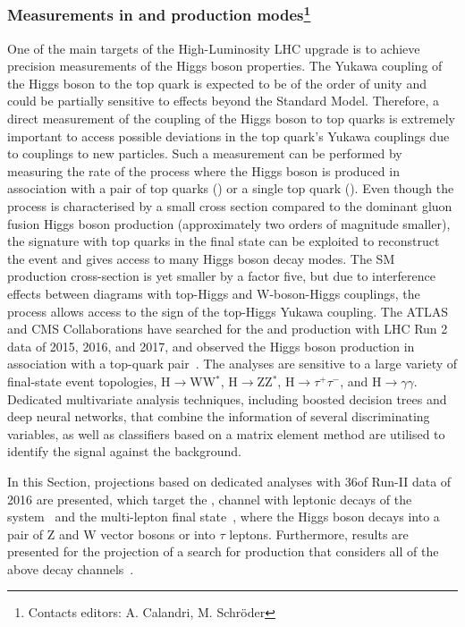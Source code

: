 \subsubsection[Measurements in \ttH and \tH production modes]{Measurements in \ttH and \tH production modes\footnote{Contacts editors: A. Calandri, M. Schr\"oder}}


One of the main targets of the High-Luminosity LHC upgrade is to achieve precision measurements of the Higgs boson properties.
The Yukawa coupling of the Higgs boson to the top quark is expected to be of the order of unity and could be partially sensitive to effects beyond the Standard Model.
Therefore, a direct measurement of the coupling of the Higgs boson to top quarks is extremely important to access possible deviations in the top quark's Yukawa couplings due to couplings to new particles.
Such a measurement can be performed by measuring the rate of the process where the Higgs boson is produced in association with a pair of top quarks (\ttH) or a single top quark (\tH).
Even though the \ttH process is characterised by a small cross section compared to the dominant gluon fusion Higgs boson production (approximately two orders of magnitude smaller), the signature with top quarks in the final state can be exploited to reconstruct the event and gives access to many Higgs boson decay modes.
The SM \tH production cross-section is yet smaller by a factor five, but due to interference effects between diagrams with top-Higgs and W-boson-Higgs couplings, the process allows access to the sign of the top-Higgs Yukawa coupling.
The ATLAS and CMS Collaborations have searched for the \ttH and \tH production with LHC Run 2 data of 2015, 2016, and 2017, and observed the Higgs boson production in association with a top-quark pair~\cite{Aaboud:2018urx,Sirunyan:2018hoz}.
The analyses are sensitive to a large variety of final-state event topologies, H$\rightarrow$WW$^{*}$, H$\rightarrow$ZZ$^{*}$, H$\rightarrow \tau^{+}\tau^{-}$, \Htobb and H$\rightarrow \gamma\gamma$.
Dedicated multivariate analysis techniques, including boosted decision trees and deep neural networks, that combine the information of several discriminating variables, as well as classifiers based on a matrix element method are utilised to identify the signal against the background.

In this Section, projections based on dedicated analyses with 36\fbinv of Run-II data of 2016 are presented, which target the \ttH, \Htobb channel with leptonic decays of the \ttbar system~\cite{Aaboud:2017rss,Sirunyan:2018mvw} and the \ttH multi-lepton final state~\cite{Aaboud:2017jvq}, where the Higgs boson decays into a pair of Z and W vector bosons or into $\tau$ leptons.
Furthermore, results are presented for the projection of a search for \tH production that considers all of the above decay channels~\cite{Sirunyan:2018lzm}.



